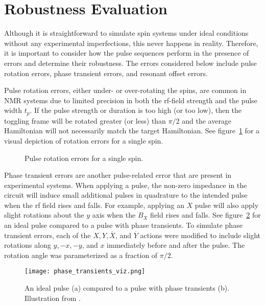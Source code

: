 \section{Robustness Evaluation}

Although it is straightforward to simulate spin systems under ideal conditions without any experimental imperfections, this never happens in reality. Therefore, it is important to consider how the pulse sequences perform in the presence of errors and determine their robustness.
The errors considered below include pulse rotation errors, phase transient errors, and resonant offset errors.

Pulse rotation errors, either under- or over-rotating the spins, are common in NMR systems due to limited precision in both the rf-field strength and the pulse width $t_p$. If the pulse strength or duration is too high (or too low), then the toggling frame will be rotated greater (or less) than $\pi/2$ and the average Hamiltonian will not necessarily match the target Hamiltonian. See figure~\ref{fig:rotation-error} for a visual depiction of rotation errors for a single spin.

\begin{figure}[H]
    \centering
    
    \caption{Pulse rotation errors for a single spin.}
    \label{fig:rotation-error}
\end{figure}

Phase transient errors are another pulse-related error that are present in experimental systems. When applying a pulse, the non-zero impedance in the circuit will induce small additional pulses in quadrature to the intended pulse when the rf field rises and falls. For example, applying an $X$ pulse will also apply slight rotations about the $y$ axis when the $B_X$ field rises and falls. See figure~\ref{fig:phase_transients} for an ideal pulse compared to a pulse with phase transients. To simulate phase transient errors, each of the $X, Y, \overline{X}$, and $\overline{Y}$ actions were modified to include slight rotations along $y, -x, -y$, and $x$ immediately before and after the pulse. The rotation angle was parameterized as a fraction of $\pi/2$.

\begin{figure}[H]
    \centering
    \texttt{[image: phase\_transients\_viz.png]}
    \caption{
    An ideal pulse (a) compared to a pulse with phase transients (b). Illustration from \cite{1976ii}.
    }
    \label{fig:phase_transients}
\end{figure}

